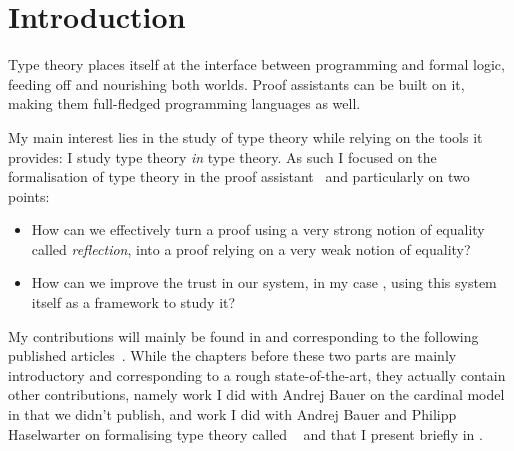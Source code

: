 \chapter{Introduction}

Type theory places itself at the interface between programming and formal logic,
feeding off and nourishing both worlds. Proof assistants can be built on it,
making them full-fledged programming languages as well.

My main interest lies in the study of type theory while relying on the tools it
provides: I study type theory \emph{in} type theory.
As such I focused on the formalisation of type theory in the \Coq proof
assistant~ and particularly on two points:
\begin{itemize}
  \item How can we effectively turn a proof using a very strong notion of
  equality called \emph{reflection}, into a proof relying on a very weak notion
  of equality?
  \item How can we improve the trust in our system, in my case \Coq, using this
  system itself as a framework to study it?
\end{itemize}

My contributions will mainly be found in  and
 corresponding to the following published
articles~.
While the chapters before these two parts are mainly introductory and
corresponding to a rough state-of-the-art, they actually contain other
contributions, namely work I did with Andrej Bauer on the cardinal model
in  that we didn't publish, and work I did with Andrej Bauer
and Philipp Haselwarter on formalising type theory called
\ftt~ and that I present briefly in
.